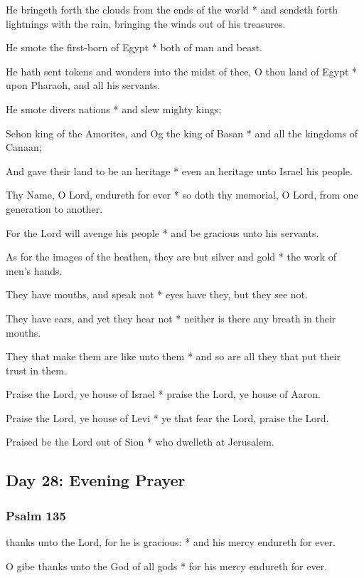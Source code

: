 He bringeth forth the clouds from the ends of the world * and sendeth forth lightnings with the rain, bringing the winds out of his treasures.

He smote the first-born of Egypt * both of man and beast.

He hath sent tokens and wonders into the midst of thee, O thou land of Egypt * upon Pharaoh, and all his servants.

He smote divers nations * and slew mighty kings;

Sehon king of the Amorites, and Og the king of Basan * and all the kingdoms of Canaan;

And gave their land to be an heritage * even an heritage unto Israel his people.

Thy Name, O Lord, endureth for ever * so doth thy memorial, O Lord, from one generation to another.

For the Lord will avenge his people * and be gracious unto his servants.

As for the images of the heathen, they are but silver and gold * the work of men's hands.

They have mouths, and speak not * eyes have they, but they see not.

They have ears, and yet they hear not * neither is there any breath in their mouths.

They that make them are like unto them * and so are all they that put their trust in them.

Praise the Lord, ye house of Israel * praise the Lord, ye house of Aaron.

Praise the Lord, ye house of Levi * ye that fear the Lord, praise the Lord.

Praised be the Lord out of Sion * who dwelleth at Jerusalem.

\subsection{Day 28: Evening Prayer}

\subsubsection{Psalm 135}


 thanks unto the Lord, for he is gracious: * and his mercy endureth for ever.

O gibe thanks unto the God of all gods * for his mercy endureth for ever.

